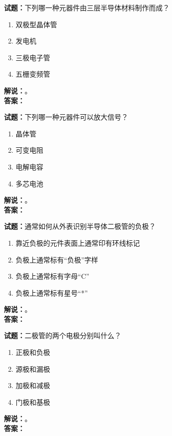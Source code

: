 \documentclass{ctexbook}
\begin{document}
\bigskip




\noindent\textbf{试题：}下列哪一种元器件由三层半导体材料制作而成？
\begin{enumerate}[leftmargin=3em]
\item 双极型晶体管
\item 发电机
\item 三极电子管
\item 五栅变频管
\end{enumerate}
\noindent\textbf{解说：}\textbf{}。\\\noindent\textbf{答案：}

\bigskip




\noindent\textbf{试题：}下列哪一种元器件可以放大信号？
\begin{enumerate}[leftmargin=3em]
\item 晶体管
\item 可变电阻
\item 电解电容
\item 多芯电池
\end{enumerate}
\noindent\textbf{解说：}\textbf{}。\\\noindent\textbf{答案：}

\bigskip




\noindent\textbf{试题：}通常如何从外表识别半导体二极管的负极？
\begin{enumerate}[leftmargin=3em]
\item 靠近负极的元件表面上通常印有环线标记
\item 负极上通常标有“负极”字样
\item 负极上通常标有字母“C”
\item 负极上通常标有星号“*”
\end{enumerate}
\noindent\textbf{解说：}\textbf{}。\\\noindent\textbf{答案：}

\bigskip




\noindent\textbf{试题：}二极管的两个电极分别叫什么？
\begin{enumerate}[leftmargin=3em]
\item 正极和负极
\item 源极和漏极
\item 加极和减极
\item 门极和基极
\end{enumerate}
\noindent\textbf{解说：}\textbf{}。\\\noindent\textbf{答案：}
\end{document}
